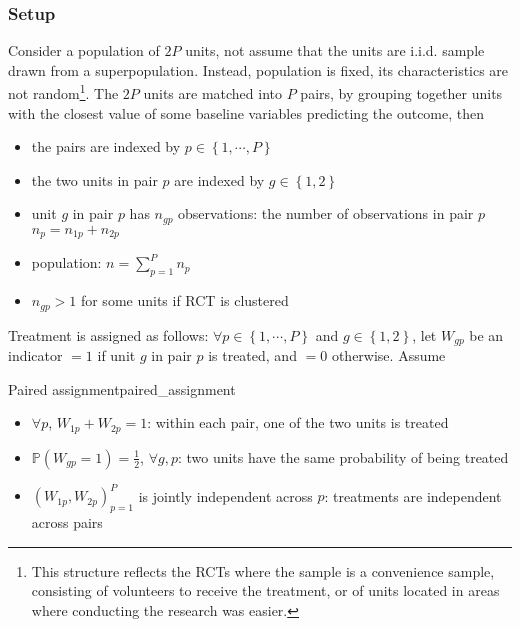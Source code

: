 \documentclass[twoside]{article}
\begin{document}
\subsubsection{Setup}
Consider a population of $2P$ units, not assume that the units are i.i.d. sample drawn from a superpopulation. Instead, population is fixed, its characteristics are not random\footnote{This structure reflects the RCTs where the sample is a convenience sample, consisting of volunteers to receive the treatment, or of units located in areas where conducting the research was easier.}.
The $2P$ units are matched into $P$ pairs, by grouping together units with the closest value of some baseline variables predicting the outcome, then 
\begin{itemize}
    \item the pairs are indexed by $p\in \left\{1,\cdots, P\right\}$
    \item the two units in pair $p$ are indexed by $g\in \left\{1,2\right\}$
    \item unit $g$ in pair $p$ has $n_{gp}$ observations: the number of observations in pair $p$ $n_p=n_{1p}+n_{2p}$
    \item population: $n = \sum^P_{p=1} n_p$
    \item $n_{gp}>1$ for some units if RCT is clustered
\end{itemize}

Treatment is assigned as follows: $\forall p\in\left\{1,\cdots,P\right\}$ and $g\in\left\{1,2\right\}$, let $W_{gp}$ be an indicator $=1$ if unit $g$ in pair $p$ is treated, and $=0$ otherwise. Assume 
\begin{assumption}{Paired assignment}{paired_assignment}
    \begin{itemize}
        \item $\forall p$, $W_{1p}+W_{2p}=1$: within each pair, one of the two units is treated
        \item $\mathbb{P}\left(W_{gp}=1\right)=\frac{1}{2}$, $\forall g, p$: two units have the same probability of being treated
        \item $\left(W_{1p},W_{2p}\right)^P_{p=1}$ is jointly independent across $p$: treatments are independent across pairs
    \end{itemize}
\end{assumption}
\end{document}
